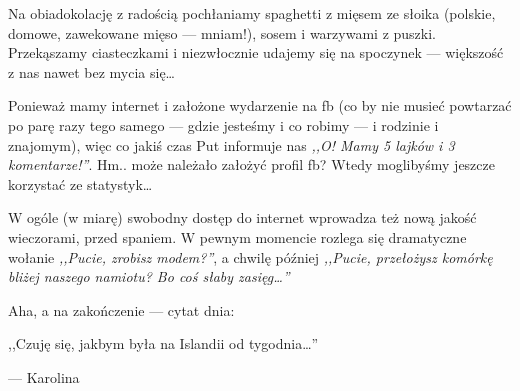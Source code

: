 Na obiadokolację z radością pochłaniamy spaghetti z mięsem ze słoika (polskie, domowe, zawekowane mięso --- mniam!), sosem i warzywami z puszki. Przekąszamy ciasteczkami i niezwłocznie udajemy się na spoczynek --- większość z nas nawet bez mycia się…


Ponieważ mamy internet i założone wydarzenie na fb (co by nie musieć powtarzać po parę razy tego samego --- gdzie jesteśmy i co robimy --- i rodzinie i znajomym), więc co jakiś czas Put informuje nas \emph{,,O! Mamy 5 lajków i 3 komentarze!''}. Hm.. może należało założyć profil fb? Wtedy moglibyśmy jeszcze korzystać ze statystyk…

W ogóle (w miarę) swobodny dostęp do internet wprowadza też nową jakość wieczorami, przed spaniem. W pewnym momencie rozlega się dramatyczne wołanie \emph{,,Pucie, zrobisz modem?''}, a chwilę później \emph{,,Pucie, przełożysz komórkę bliżej naszego namiotu? Bo coś słaby zasięg…''}

\vspace{16pt}

Aha, a na zakończenie --- cytat dnia:
\epigraph{,,Czuję się, jakbym była na Islandii od tygodnia…''}{--- \textup{Karolina}}

